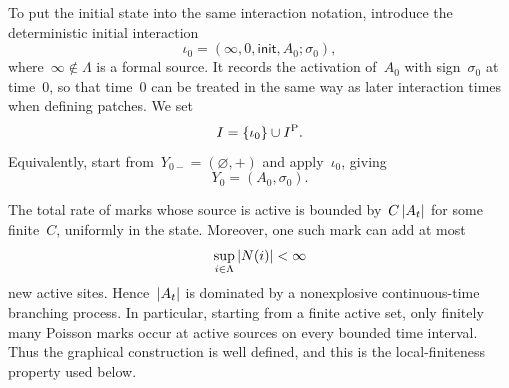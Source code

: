 To put the initial state into the same interaction notation, introduce the
deterministic initial interaction
\begin{equation}
\label{eq:initial-interaction}
\iota_0
=
(\infty,0,\mathsf{init},A_0;\sigma_0),
\end{equation}
where~$\infty\notin\Lambda$ is a formal source. It records the activation of~$A_0$
with sign~$\sigma_0$ at time~$0$, so that time~$0$ can be treated in the same
way as later interaction times when defining patches. We set
\begin{equation*}
I=\left\{\iota_0\right\}\cup I^{\mathrm P}.
\end{equation*}
Equivalently, start from~$Y_{0-}=(\varnothing,+)$ and apply~$\iota_0$, giving
\begin{equation*}
Y_0=(A_0,\sigma_0).
\end{equation*}

The total rate of marks whose source is active is bounded by~$C\left|A_t\right|$ for
some finite~$C$, uniformly in the state. Moreover, one such mark can add at most
\begin{equation*}
\sup_{i\in\Lambda}\left|N(i)\right|<\infty
\end{equation*}
new active sites. Hence~$\left|A_t\right|$ is dominated by a nonexplosive
continuous-time branching process. In particular, starting from a finite active
set, only finitely many Poisson marks occur at active sources on every bounded
time interval. Thus the graphical construction is well defined, and this is the
local-finiteness property used below.
